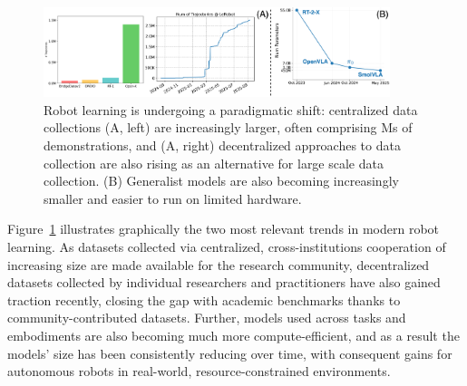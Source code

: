 \begin{figure}
    \centering
    \includegraphics[width=0.9\textwidth]{figures/ch5/ch5-trends.png}
    \caption{Robot learning is undergoing a paradigmatic shift: centralized data collections (A, left) are increasingly larger, often comprising Ms of demonstrations, and (A, right) decentralized approaches to data collection are also rising as an alternative for large scale data collection. (B) Generalist models are also becoming increasingly smaller and easier to run on limited hardware.}
    \label{fig:ch5-trends}
\end{figure}

Figure~\ref{fig:ch5-trends} illustrates graphically the two most relevant trends in modern robot learning.
As datasets collected via centralized, cross-institutions cooperation of increasing size are made available for the research community, decentralized datasets collected by individual researchers and practitioners have also gained traction recently, closing the gap with academic benchmarks thanks to community-contributed datasets.
Further, models used across tasks and embodiments are also becoming much more compute-efficient, and as a result the models' size has been consistently reducing over time, with consequent gains for autonomous robots in real-world, resource-constrained environments.


